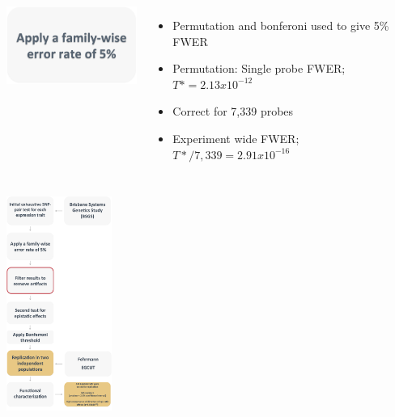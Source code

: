 \documentclass{beamer}
\begin{document}
\begin{frame}
\begin{columns}[c]
\includegraphics[width=4.5cm]{images/fam_wise.pdf} \\
\begin{itemize}
\item Permutation and bonferoni used to give 5\% FWER
\vspace{0.2cm} 
\item Permutation: Single probe FWER;  $T*= 2.13x10^{-12}$ 
\vspace{0.2cm} 
\item Correct for 7,339 probes
\vspace{0.2cm} 
\item Experiment wide FWER; $T*/7,339=2.91x10^{-16}$  
\end{itemize}
\end{columns}
\end{frame}

\begin{frame}
\begin{center}
\includegraphics[height=7cm]{images/methods5.png} \\
\end{center}
\end{frame}
\end{document}
